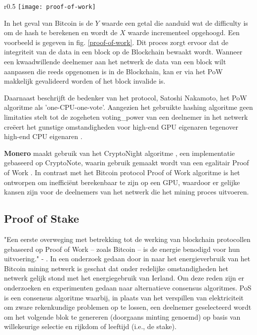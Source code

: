 \begin{wrapfigure}{r}{0.5\textwidth}
  \texttt{[image: proof-of-work]}
  \caption[Proof-of-Work in Bitcoin]{Werking Proof-of-Work, van \citet{ProofofWork}. Wanneer de eerste vier bits ($Y = 4$) van de hash 0 zijn is de proef opgelost. }
  \label{proof-of-work}    
\end{wrapfigure}
In het geval van Bitcoin is de $Y$ waarde een getal die aanduid wat de \gls{difficulty} is om de hash te berekenen en wordt de $X$ waarde incrementeel opgehoogd. Een voorbeeld is gegeven in fig. \ref{proof-of-work}. Dit proces zorgt ervoor dat de integriteit van de data in een block op de Blockchain bewaakt wordt. Wanneer een kwaadwillende deelnemer aan het netwerk de data van een block wilt aanpassen die reeds opgenomen is in de Blockchain, kan er via het \acrshort{PoW} makkelijk gevalideerd worden of het block invalide is.

Daarnaast beschrijft de bedenker van het protocol, Satoshi Nakamoto, het \acrshort{PoW} algoritme als 'one-CPU-one-vote'. Aangezien het gebruikte hashing algoritme geen limitaties stelt tot de zogeheten \gls{voting_power} van een deelnemer in het netwerk creëert het gunstige omstandigheden voor high-end GPU eigenaren tegenover high-end CPU eigenaren \citep[p.~2]{van2013cryptonote}.

\textbf{Monero} maakt gebruik van het CryptoNight algoritme \citep{noether2014monero}, een implementatie gebaseerd op CryptoNote, waarin gebruik gemaakt wordt van een egalitair Proof of Work \citep[p.~11]{van2013cryptonote}. In contrast met het Bitcoin protocol Proof of Work algoritme is het ontworpen om inefficiënt berekenbaar te zijn op een GPU, waardoor er gelijke kansen zijn voor de deelnemers van het netwerk die het mining proces uitvoeren.

\newpage
\subsection{Proof of Stake}

"Een eerste overweging met betrekking tot de werking van blockchain protocollen gebaseerd op Proof of Work -- zoals Bitcoin -- is de energie benodigd voor hun uitvoering." - \citet{kiayias2017ouroboros}.
In een onderzoek gedaan door \citeauthor{ODwyer:Bitcoin} in \citeyear{ODwyer:Bitcoin} naar het energieverbruik van het Bitcoin mining netwerk is geschat dat onder redelijke omstandigheden het netwerk gelijk stond met het energiegebruik van Ierland. Om deze reden zijn er onderzoeken en experimenten gedaan naar alternatieve consensus algoritmes. \acrfull{PoS} is een consensus algoritme waarbij, in plaats van het verspillen van elektriciteit om zware rekenkundige problemen op te lossen, een deelnemer geselecteerd wordt om het volgende blok te genereren (doorgaans \gls{minting} genoemd) op basis van willekeurige selectie en rijkdom of leeftijd (i.e., de stake).

